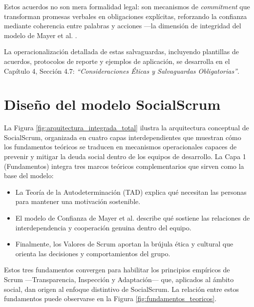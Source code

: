 Estos acuerdos no son mera formalidad legal: son mecanismos de \textit{commitment} que transforman promesas verbales en obligaciones explícitas, reforzando la confianza mediante coherencia entre palabras y acciones —la dimensión de integridad del modelo de Mayer et al. \cite{mayer_integrative_1995}.

La operacionalización detallada de estas salvaguardas, incluyendo plantillas de acuerdos, protocolos de reporte y ejemplos de aplicación, se desarrolla en el Capítulo 4, Sección 4.7: \textit{``Consideraciones Éticas y Salvaguardas Obligatorias''}.

\FloatBarrier

\section{Diseño del modelo SocialScrum}

La Figura \ref{fig:arquitectura_integrada_total} ilustra la arquitectura conceptual de SocialScrum, organizada en cuatro capas interdependientes que muestran cómo los fundamentos teóricos se traducen en mecanismos operacionales capaces de prevenir y mitigar la deuda social dentro de los equipos de desarrollo.
La Capa 1 (Fundamentos) integra tres marcos teóricos complementarios que sirven como la base del modelo:

\begin{itemize}
    \item La Teoría de la Autodeterminación (TAD) explica qué necesitan las personas para mantener una motivación sostenible.
    \item El modelo de Confianza de Mayer et al. describe qué sostiene las relaciones de interdependencia y cooperación genuina dentro del equipo.
    \item Finalmente, los Valores de Scrum aportan la brújula ética y cultural que orienta las decisiones y comportamientos del grupo.
\end{itemize}

Estos tres fundamentos convergen para habilitar los principios empíricos de Scrum —Transparencia, Inspección y Adaptación— que, aplicados al ámbito social, dan origen al enfoque distintivo de SocialScrum.
La relación entre estos fundamentos puede observarse en la Figura \ref{fig:fundamentos_teoricos}.

